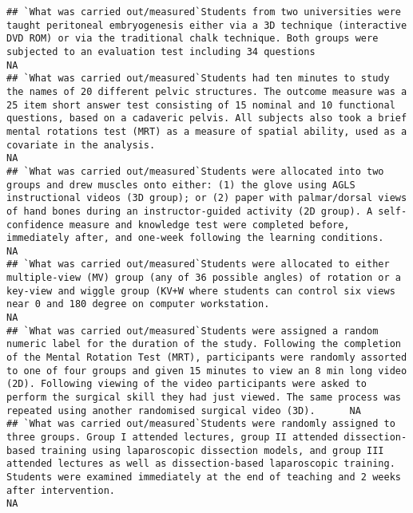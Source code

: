 \documentclass[]{article}
\begin{document}
\begin{verbatim}
## `What was carried out/measured`Students from two universities were taught peritoneal embryogenesis either via a 3D technique (interactive DVD ROM) or via the traditional chalk technique. Both groups were subjected to an evaluation test including 34 questions                                                                                                                                                                                                                   NA
## `What was carried out/measured`Students had ten minutes to study the names of 20 different pelvic structures. The outcome measure was a 25 item short answer test consisting of 15 nominal and 10 functional questions, based on a cadaveric pelvis. All subjects also took a brief mental rotations test (MRT) as a measure of spatial ability, used as a covariate in the analysis.                                                                                                NA
## `What was carried out/measured`Students were allocated into two groups and drew muscles onto either: (1) the glove using AGLS instructional videos (3D group); or (2) paper with palmar/dorsal views of hand bones during an instructor-guided activity (2D group). A self-confidence measure and knowledge test were completed before, immediately after, and one-week following the learning conditions.                                                                           NA
## `What was carried out/measured`Students were allocated to either multiple-view (MV) group (any of 36 possible angles) of rotation or a key-view and wiggle group (KV+W where students can control six views near 0 and 180 degree on computer workstation.                                                                                                                                                                                                                           NA
## `What was carried out/measured`Students were assigned a random numeric label for the duration of the study. Following the completion of the Mental Rotation Test (MRT), participants were randomly assorted to one of four groups and given 15 minutes to view an 8 min long video (2D). Following viewing of the video participants were asked to perform the surgical skill they had just viewed. The same process was repeated using another randomised surgical video (3D).      NA
## `What was carried out/measured`Students were randomly assigned to three groups. Group I attended lectures, group II attended dissection-based training using laparoscopic dissection models, and group III attended lectures as well as dissection-based laparoscopic training. Students were examined immediately at the end of teaching and 2 weeks after intervention.                                                                                                            NA

\end{verbatim}
\end{document}
